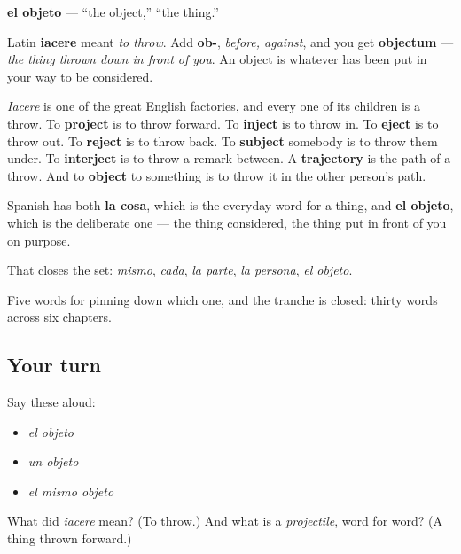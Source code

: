 \begin{cousinweb}
\textbf{el objeto} — \textquotedblleft{}the object,\textquotedblright{} \textquotedblleft{}the thing.\textquotedblright{}

Latin \textbf{iacere} meant \emph{to throw}. Add \textbf{ob-}, \emph{before, against}, and you get \textbf{objectum} — \emph{the thing thrown down in front of you}. An object is whatever has been put in your way to be considered.

\emph{Iacere} is one of the great English factories, and every one of its children is a throw. To \textbf{project} is to throw forward. To \textbf{inject} is to throw in. To \textbf{eject} is to throw out. To \textbf{reject} is to throw back. To \textbf{subject} somebody is to throw them under. To \textbf{interject} is to throw a remark between. A \textbf{trajectory} is the path of a throw. And to \textbf{object} to something is to throw it in the other person's path.

Spanish has both \textbf{la cosa}, which is the everyday word for a thing, and \textbf{el objeto}, which is the deliberate one — the thing considered, the thing put in front of you on purpose.

That closes the set: \emph{mismo}, \emph{cada}, \emph{la parte}, \emph{la persona}, \emph{el objeto}.
\end{cousinweb}

\begin{grammarlens}[title={What you've built}]
Five words for pinning down which one, and the tranche is closed: thirty words across six chapters.
\end{grammarlens}

\subsection*{Your turn}
Say these aloud:

\begin{itemize}
\raggedright
  \item \emph{el objeto}
  \item \emph{un objeto}
  \item \emph{el mismo objeto}
\end{itemize}

\begin{tcolorbox}[breakable,colback=teal!4,colframe=teal!35!black,title={Before you move on}]
What did \emph{iacere} mean? (To throw.) And what is a \emph{projectile}, word for word? (A thing thrown forward.)
\end{tcolorbox}
